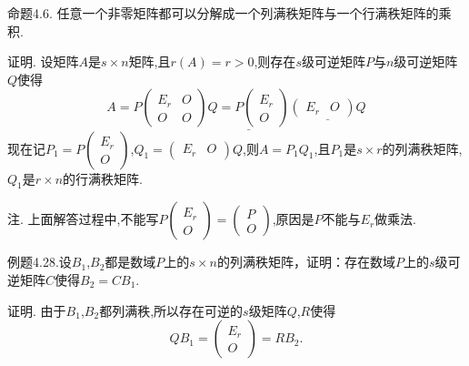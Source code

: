 \documentclass{article}
\begin{document}
{\heiti 命题4.6.} {\kaishu 任意一个非零矩阵都可以分解成一个列满秩矩阵与一个行满秩矩阵的乘积.}

{\heiti 证明.} 设矩阵$A$是$s \times n$矩阵,且$r \left(A\right) = r > 0$,则存在$s$级可逆矩阵$P$与$n$级可逆矩阵$Q$使得
\begin{equation*}
    A=P\left(\begin{array}{cc}
            E_{r} & O \\
            O     & O
        \end{array}\right)
    \underline{Q=P\left(\begin{array}{c}
            E_{r} \\
            O
        \end{array}\right)}
    \underline{\left(\begin{array}{ll}
            E_{r} & O
        \end{array}\right) Q}
\end{equation*}
现在记$P_1 = P \left(
    \begin{array}{c}
            E_r \\
            O
        \end{array}
    \right)$,$Q_1 = \left(
    \begin{array}{cc}
            E_r & O
        \end{array}
    \right)Q$,则$A = P_1Q_1$,且$P_1$是$s \times r$的列满秩矩阵,$Q_1$是$r \times n$的行满秩矩阵.

注. 上面解答过程中,不能写$P \left(
    \begin{array}{c}
            E_r \\
            O
        \end{array}
    \right)
    =
    \left(
    \begin{array}{c}
            P \\
            O
        \end{array}
    \right)$,原因是$P$不能与$E_r$做乘法.

{\heiti 例题4.28.}{\kaishu 设$B_1$,$B_2$都是数域$P$上的$s \times n$的列满秩矩阵，证明：存在数域$P$上的$s$级可逆矩阵$C$使得$B_2 = CB_1$.}

{\heiti 证明.} 由于$B_1$,$B_2$都列满秩,所以存在可逆的$s$级矩阵$Q$,$R$使得
\begin{equation*}
    Q B_{1}=\left(\begin{array}{c}
            E_{r} \\
            O
        \end{array}\right)=R B_{2}.
\end{equation*}
\end{document}
